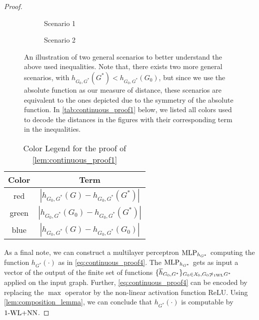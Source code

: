 \begin{proof}
\begin{enumerate}
        \begin{figure}[H]
            \centering
            \begin{subfigure}{0.45\textwidth}
                \centering
                
                \caption{Scenario 1}      
            \end{subfigure}
            \begin{subfigure}{0.45\textwidth}
                \centering
                 
                \caption{Scenario 2}        
            \end{subfigure}
            \caption{An illustration of two general scenarios to better understand the above used inequalities. Note that, there exists two more general scenarios, with $h_{G_0, G^*}(G^*) < h_{G_0, G^*}(G_0)$, but since we use the absolute function as our measure of distance, these scenarios are equivalent to the ones depicted due to the symmetry of the absolute function. In \autoref{tab:continuous_proof1} below, we listed all colors used to decode the distances in the figures with their corresponding term in the inequalities.}
            \label{fig:proof_support}
        \end{figure}
        \begin{table}[H]
            \centering
            \begin{tabular}{ c | c }
                Color & Term \\
                \hline
                red  & $|h_{G_0, G^*}(G) - h_{G_0, G^*}(G^*)|$\\
                green & $|h_{G_0, G^*}(G_0) - h_{G_0, G^*}(G^*)|$\\ 
                blue & $|h_{G_0, G^*}(G) - h_{G_0, G^*}(G_0)|$\\
            \end{tabular}
            \caption{Color Legend for the proof of \cref{lem:continuous_proof1}}
            \label{tab:continuous_proof1}
        \end{table}
    \end{enumerate}

    As a final note, we can construct a multilayer perceptron $\text{MLP}_{h_{G^*}}$ computing the function $h_{G^*}(\cdot)$ as in \autoref{eq:continuous_proof4}. The $\text{MLP}_{h_{G^*}}$ gets as input a vector of the output of the finite set of functions $\{ \overline{h}_{G_0, G^*}\}_{G_0 \in \mathcal{X}_0, G_0 \not \simeq_{\text{1WL}} G^*}$ applied on the input graph. Further, \autoref{eq:continuous_proof4} can be encoded by replacing the $\max$ operator by the non-linear activation function ReLU. Using \cref{lem:composition_lemma}, we can conclude that $h_{G^*}(\cdot)$ is computable by $\text{1-WL+NN}$.

\end{proof}

